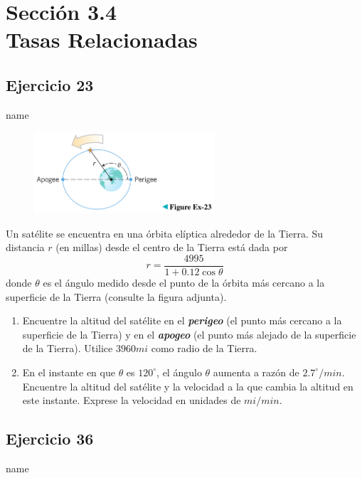 \documentclass[12pt]{article}
\begin{document}
\section{Sección 3.4 \\ Tasas Relacionadas} 
\subsection{Ejercicio 23} name \\

\begin{figure}[H]
\centering
\includegraphics[width=0.6\textwidth]{../img/img_Lista3/23.png}
\end{figure}
Un satélite se encuentra en una órbita elíptica alrededor de la Tierra. Su distancia $r$ (en millas) desde el centro de la Tierra está dada por
\[
r=\frac{4995}{1+0.12\cos{\theta}}
\]
donde $\theta$ es el ángulo medido desde el punto de la órbita más cercano a la superficie de la Tierra (consulte la figura adjunta).
\begin{enumerate}
\item Encuentre la altitud del satélite en el \textit{\textbf{perigeo}} (el punto más cercano a la superficie de la Tierra) y en el \textit{\textbf{apogeo}} (el punto más alejado de la superficie de la Tierra). Utilice $3960 mi$ como radio de la Tierra.
\item En el instante en que $\theta$ es $120^{\circ}$, el ángulo $\theta$ aumenta a razón de $2.7^{\circ} /min$. Encuentre la altitud del satélite y la velocidad a la que cambia la altitud en este instante. Exprese la velocidad en unidades de $mi/min$.
\end{enumerate}

\subsection{Ejercicio 36} name \\
\end{document}

